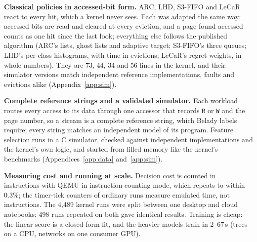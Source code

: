 \documentclass{article}
\newcommand{\belady}{Belady\xspace}
\newcommand{\finding}[1]{\textbf{#1}\hspace{0.4em}}
\begin{document}
\finding{Classical policies in accessed-bit form.} ARC, LHD, S3-FIFO and
LeCaR~\citep{vietri2018lecar} react to every hit, which a kernel never sees. Each was
adapted the same way: accessed bits are read and cleared at every eviction, and a page
found accessed counts as one hit since the last look; everything else follows the
published algorithm (ARC's lists, ghost lists and adaptive target; S3-FIFO's three queues;
LHD's per-class histograms, with time in evictions; LeCaR's regret weights, in whole
numbers). They are 73, 44, 34 and 56 lines in the kernel, and their simulator versions
match independent reference implementations, faults and evictions alike
(Appendix~\ref{app:sim}).

\finding{Complete reference strings and a validated simulator.} Each workload routes
every access to its data through one accessor that records \texttt{R} or \texttt{W} and
the page number, so a stream is a complete reference string, which \belady labels
require; every string matches an independent model of its program. Feature selection
runs in a C simulator, checked against independent implementations and the kernel's own
logic, and started from filled memory like the kernel's benchmarks
(Appendices~\ref{app:data} and~\ref{app:sim}).

\finding{Measuring cost and running at scale.} Decision cost is counted in instructions
with QEMU in instruction-counting mode, which repeats to within 0.3\%; the timer-tick
counters of ordinary runs measure emulated time, not instructions. The 4,489 kernel runs
were split between one desktop and cloud notebooks; 498 runs repeated on both gave
identical results. Training is cheap: the linear score is a closed-form fit, and the
heavier models train in 2--67\,s (trees on a CPU, networks on one consumer GPU).
\end{document}
